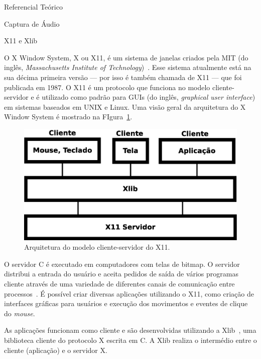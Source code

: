 \begin{chapter}{Referencial Teórico}
\begin{section}{Captura de Áudio}
\end{section}

\begin{section}{X11 e Xlib}

O X Window System, X ou X11, é um sistema de janelas criados pela MIT (do
inglês, \textit{Massachusetts Institute of Technology})~\cite{xlib}. Esse
sistema atualmente está na sua décima primeira versão --- por isso é também 
chamada de X11 --- que foi publicada em 1987. O X11 é um protocolo que funciona
no modelo cliente-servidor e é utilizado como padrão para GUIs (do inglês,
\textit{graphical user interface}) em sistemas baseados em UNIX e Linux. Uma
visão geral da arquitetura do X Window System é mostrado na
FIgura~\ref{fig:x11}.

\begin{figure}[!h]
	\centering
	\begin{minipage}[c]{\textwidth}
	\centering
	\includegraphics[width=0.7\linewidth]{fig/X11}
	\caption{Arquitetura do modelo cliente-servidor do X11.}
	\label{fig:x11}
	\end{minipage}
\end{figure} 

O servidor C é executado em computadores com telas de bitmap. O servidor
distribui a entrada do usuário e aceita pedidos de saída de vários programas
cliente através de uma variedade de diferentes canais de comunicação entre
processos~\cite{suse}. É possível criar diversas aplicações utilizando o X11,
como criação de interfaces gráficas para usuários e execução dos movimentos e
eventes de clique do \textit{mouse}. 

As aplicações funcionam como cliente e são desenvolvidas utilizando a
Xlib~\cite{xlib}, uma biblioteca cliente do protocolo X escrita em C. A Xlib
realiza o intermédio entre o cliente (aplicação) e o servidor X.  
\end{section}

\end{chapter}
